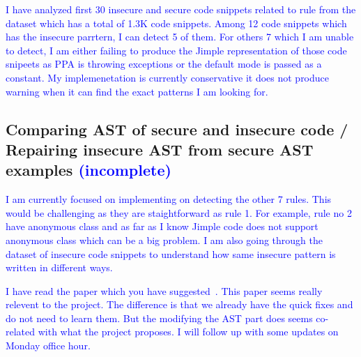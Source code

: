 \documentclass[sigconf]{acmart}
\begin{document}
\textcolor {blue}{I have analyzed first 30 insecure and secure code snippets related to rule from the dataset which has a total of 1.3K code snippets. Among 12 code snippets which has the insecure parrtern, I can detect 5 of them. For others 7 which I am unable to detect, I am either failing to produce the Jimple representation of those code snipeets as PPA is throwing exceptions or the default mode is passed as a constant. My implemenetation is currently conservative it does not produce warning when it can find the exact patterns I am looking for.}

\subsection{Comparing AST of secure and insecure code / Repairing insecure AST from secure AST examples \textcolor{blue}{(incomplete)}}
\textcolor{blue}{
I am currently focused on implementing on detecting the other 7 rules. This would be challenging as they are staightforward as rule 1. For example, rule no 2 have anonymous class and as far as I know Jimple code does not support  anonymous class which can be a big problem. I am also going through the dataset of insecure code snippets to understand how same insecure pattern is written in different ways.} 

\textcolor{blue}{
I have read the paper which you have suggested~\cite{rolim2018learning}. This paper seems really relevent to the project. The difference is that we already have the quick fixes and do not need to learn them. But the modifying the AST part does seems co-related with what the project proposes. I will follow up with some updates on Monday office hour.}
\end{document}
